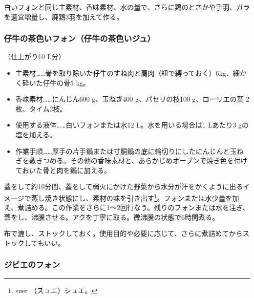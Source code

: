 \begin{recette}
白いフォンと同じ主素材、香味素材、水の量で、さらに鶏のとさかや手羽、ガラを適宜増量し、廃鶏3羽を加えて作る。

\hypertarget{jus-de-veau-brun}{%
\subsubsection{仔牛の茶色いフォン（仔牛の茶色いジュ）}\label{jus-de-veau-brun}}



（仕上がり10 L分）

\begin{itemize}
\item
  主素材\ldots{}\ldots{}骨を取り除いた仔牛のすね肉と肩肉（紐で縛っておく）6kg、細かく砕いた仔牛の骨5
  kg。
\item
  香味素材\ldots{}\ldots{}にんじん600 g、玉ねぎ400 g、パセリの枝100
  g、ローリエの葉 2枚、タイム2枝。
\item
  使用する液体\ldots{}\ldots{}白いフォンまたは水12 L。水を用いる場合は1
  Lあたり3 gの塩を加える。
\item
  作業手順\ldots{}\ldots{}厚手の片手鍋または寸胴鍋の底に輪切りにしたにんじんと玉ねぎを敷きつめる。その他の香味素材と、あらかじめオーブンで焼き色を付けておいた骨と肉を鍋に加える。
\end{itemize}

蓋をして約10分間、蓋をして弱火にかけた野菜から水分が汗をかくように出るイメージで蒸し焼き状態にし、素材の味を引き出す\footnote{suer
  （スュエ）シュエ。}。フォンまたは水少量を加え、煮詰める。この作業をさらに1〜2回行なう。残りのフォンまたは水を注ぎ、蓋をし、沸騰させる。アクを丁寧に取る。微沸騰の状態で6時間煮る。

布で漉し、ストックしておく。使用目的や必要に応じて、さらに煮詰めてからストックしてもいい。

\hypertarget{fonds-de-gibier}{%
\subsubsection{ジビエのフォン}\label{fonds-de-gibier}}



\end{recette}
